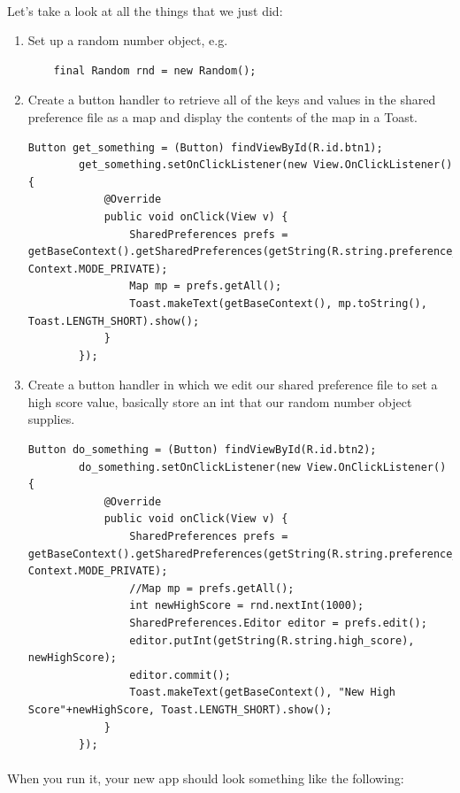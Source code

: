 \paragraph{} Let's take a look at all the things that we just did:

\begin{enumerate}
\item Set up a random number object, e.g.
\begin{lstlisting}
    final Random rnd = new Random();
\end{lstlisting}
\item Create a button handler to retrieve all of the keys and values in the shared preference file as a map and display the contents of the map in a Toast.
\begin{lstlisting}
Button get_something = (Button) findViewById(R.id.btn1);
        get_something.setOnClickListener(new View.OnClickListener() {
            @Override
            public void onClick(View v) {
                SharedPreferences prefs = getBaseContext().getSharedPreferences(getString(R.string.preference_file_name), Context.MODE_PRIVATE);
                Map mp = prefs.getAll();
                Toast.makeText(getBaseContext(), mp.toString(), Toast.LENGTH_SHORT).show();
            }
        });
\end{lstlisting}
\item Create a button handler in which we edit our shared preference file to set a high score value, basically store an int that our random number object supplies.
\begin{lstlisting}
Button do_something = (Button) findViewById(R.id.btn2);
        do_something.setOnClickListener(new View.OnClickListener() {
            @Override
            public void onClick(View v) {
                SharedPreferences prefs = getBaseContext().getSharedPreferences(getString(R.string.preference_file_name), Context.MODE_PRIVATE);
                //Map mp = prefs.getAll();
                int newHighScore = rnd.nextInt(1000);
                SharedPreferences.Editor editor = prefs.edit();
                editor.putInt(getString(R.string.high_score), newHighScore);
                editor.commit();
                Toast.makeText(getBaseContext(), "New High Score"+newHighScore, Toast.LENGTH_SHORT).show();
            }
        });
\end{lstlisting}
\end{enumerate}


\paragraph{} When you run it, your new app should look something like the following:

